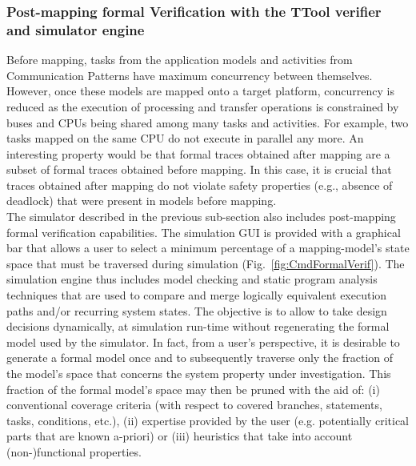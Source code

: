 \documentclass{llncs}
\begin{document}
\subsubsection{Post-mapping formal Verification with the TTool verifier and simulator engine}
%
Before mapping, tasks from the application models and activities from Communication Patterns have maximum concurrency
between themselves. However, once these models are mapped onto a target platform, concurrency is reduced as the
execution of processing and transfer operations is constrained by buses and CPUs being shared among many tasks and
activities. For example, two tasks mapped on the same CPU do not execute in parallel any more. An interesting property
would be that formal traces obtained after mapping are a subset of formal traces obtained before mapping. In this case,
it is crucial that traces obtained after mapping do not violate safety properties (e.g., absence of deadlock) that were
present in models before mapping.\\
%
The simulator described in the previous sub-section also includes  post-mapping formal verification capabilities. The simulation
 GUI is provided with a graphical bar that allows a user to select a minimum percentage of a mapping-model’s state space that must
be traversed during simulation (Fig.~\ref{fig:CmdFormalVerif}). The simulation engine thus includes model checking and static program analysis
techniques that are used to compare and merge logically equivalent execution paths and/or recurring system states. The
objective is to allow to take design decisions dynamically, at simulation run-time without regenerating the formal model
used by the simulator. In fact, from a user's perspective, it is desirable to generate a formal model once and to
subsequently traverse only the fraction of the model's space that concerns the system property under investigation. This
fraction of the formal model's space may then be pruned with the aid of: (i) conventional coverage criteria (with
respect to covered branches, statements, tasks, conditions, etc.), (ii) expertise provided by the user (e.g.
potentially critical parts that are known a-priori) or (iii) heuristics that take into account (non-)functional
properties.\\
%
%
%
\end{document}
